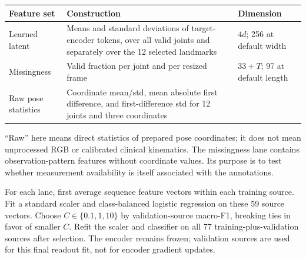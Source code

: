 \documentclass[11pt,letterpaper]{article}
\newcounter{none}
\begin{document}
\begin{minipage}{\linewidth}

{\def\LTcaptype{none} %
\begin{longtable}[]{@{}
  >{\raggedright\arraybackslash}p{}
  >{\raggedright\arraybackslash}p{}
  >{\raggedleft\arraybackslash}p{}@{}}
\toprule\noalign{}
\begin{minipage}[b]{\linewidth}\raggedright
Feature set
\end{minipage} & \begin{minipage}[b]{\linewidth}\raggedright
Construction
\end{minipage} & \begin{minipage}[b]{\linewidth}\raggedleft
Dimension
\end{minipage} \\
\midrule\noalign{}
\endhead
\bottomrule\noalign{}
\endlastfoot
Learned latent & Means and standard deviations of target-encoder tokens,
over all valid joints and separately over the 12 selected landmarks &
\(4d\); 256 at default width \\
Missingness & Valid fraction per joint and per resized frame & \(33+T\);
97 at default length \\
Raw pose statistics & Coordinate mean/std, mean absolute first
difference, and first-difference std for 12 joints and three coordinates
& 144 \\
\end{longtable}
}

\end{minipage}

``Raw'' here means direct statistics of prepared pose coordinates; it
does not mean unprocessed RGB or calibrated clinical kinematics. The
missingness lane contains observation-pattern features without
coordinate values. Its purpose is to test whether measurement
availability is itself associated with the annotations.

For each lane, first average sequence feature vectors within each
training source. Fit a standard scaler and class-balanced logistic
regression on these 59 source vectors. Choose \(C\in\{0.1,1,10\}\) by
validation-source macro-F1, breaking ties in favor of smaller \(C\).
Refit the scaler and classifier on all 77 training-plus-validation
sources after selection. The encoder remains frozen; validation sources
are used for this final readout fit, not for encoder gradient updates.
\end{document}
